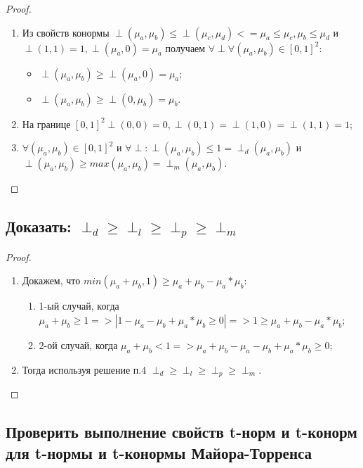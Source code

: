 \documentclass[12pt]{article}
\begin{document}
\begin{proof}
    \begin{enumerate}
        \item Из свойств конормы $\perp(\mu_a, \mu_b)\le\perp(\mu_c, \mu_d) <= \mu_a\le\mu_c, \mu_b\le\mu_d$
   и $\perp(1, 1)=1, \perp(\mu_a, 0)=\mu_a$ получаем
   $\forall \perp \forall (\mu_a, \mu_b)\in[0, 1]^2$:
            \begin{itemize}
                \item $\perp(\mu_a, \mu_b) \ge \perp(\mu_a, 0)=\mu_a$;
                \item $\perp(\mu_a, \mu_b) \ge \perp(0, \mu_b)=\mu_b$.
            \end{itemize}
        \item На границе $[0, 1]^2 \perp(0, 0)=0, \perp(0, 1)=\perp(1, 0)=\perp(1, 1)=1$;
        \item $\forall(\mu_a, \mu_b)\in[0, 1]^2$ и $\forall \perp: \perp(\mu_a, \mu_b)\le 1=\perp_d(\mu_a, \mu_b)$ 
   и $\perp(\mu_a, \mu_b)\ge max(\mu_a, \mu_b)=\perp_m(\mu_a, \mu_b)$.
    \end{enumerate}
\end{proof}

\subsection{Доказать: $\perp_d\ge \perp_l\ge \perp_p\ge \perp_m$}

\begin{proof}
    \begin{enumerate}
        \item Докажем, что $min(\mu_a+\mu_b, 1)\ge\mu_a+\mu_b-\mu_a*\mu_b$:
            \begin{enumerate}
                \item 1-ый случай, когда 
      $\mu_a+\mu_b\ge1 => |1-\mu_a-\mu_b+\mu_a*\mu_b\ge0| => 1\ge \mu_a+\mu_b-\mu_a*\mu_b$; 
                \item 2-ой случай, когда $\mu_a+\mu_b<1 => \mu_a+\mu_b-\mu_a-\mu_b+\mu_a*\mu_b \ge 0$;
            \end{enumerate}
        \item Тогда используя решение п.4
   $\perp_d\ge\perp_l\ge\perp_p\ge\perp_m$.
    \end{enumerate}
\end{proof}

\subsection{Проверить выполнение свойств t-норм и t-конорм для t-нормы и t-конормы
Майора-Торренса}
\end{document}
